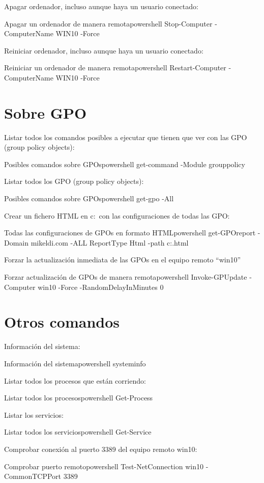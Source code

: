 Apagar ordenador, incluso aunque haya un usuario conectado:
\begin{mycode}{Apagar un ordenador de manera remota}{powershell}{}
Stop-Computer -ComputerName WIN10 -Force
\end{mycode}

Reiniciar ordenador, incluso aunque haya un usuario conectado:
\begin{mycode}{Reiniciar un ordenador de manera remota}{powershell}{}
Restart-Computer -ComputerName WIN10 -Force
\end{mycode}

\section{Sobre GPO}
Listar todos los comandos posibles a ejecutar que tienen que ver con las GPO (group policy objects):
\begin{mycode}{Posibles comandos sobre GPOs}{powershell}{}
get-command -Module grouppolicy
\end{mycode}


Listar todos los GPO (group policy objects):
\begin{mycode}{Posibles comandos sobre GPOs}{powershell}{}
get-gpo -All
\end{mycode}

Crear un fichero HTML en c:\  con las configuraciones de todas las GPO:
\begin{mycode}{Todas las configuraciones de GPOs en formato HTML}{powershell}{}
get-GPOreport -Domain mikeldi.com -ALL ReportType Html -path c:\gpo.html
\end{mycode}

Forzar la actualización inmediata de las GPOs en el equipo remoto “win10”
\begin{mycode}{Forzar actualización de GPOs de manera remota}{powershell}{}
Invoke-GPUpdate -Computer win10 -Force -RandomDelayInMinutes 0
\end{mycode}


\section{Otros comandos}
Información del sistema:
\begin{mycode}{Información del sistema}{powershell}{}
systeminfo
\end{mycode}

Listar todos los procesos que están corriendo:
\begin{mycode}{Listar todos los procesos}{powershell}{}
Get-Process
\end{mycode}

Listar los servicios:
\begin{mycode}{Listar todos los servicios}{powershell}{}
Get-Service
\end{mycode}


Comprobar conexión al puerto 3389 del equipo remoto win10:
\begin{mycode}{Comprobar puerto remoto}{powershell}{}
Test-NetConnection win10 -CommonTCPPort 3389
\end{mycode}
